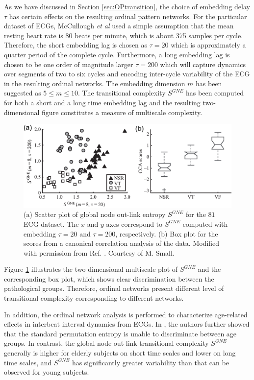 	As we have discussed in Section \ref{sec:OPtransition}, the choice of embedding delay $\tau$ has certain effects on the resulting ordinal pattern networks. For the particular dataset of ECGs, McCullough {\textit{et al}} used a simple assumption that the mean resting heart rate is $80$ beats per minute, which is about 375 samples per cycle. Therefore, the short embedding lag is chosen as $\tau = 20$ which is approximately a quarter period of the complete cycle. Furthermore, a long embedding lag is chosen to be one order of magnitude larger $\tau = 200$ which will capture dynamics over segments of two to six cycles and encoding inter-cycle variability of the ECG in the resulting ordinal networks. The embedding dimension $m$ has been suggested as $5 \leq m \leq 10$. The transitional complexity $S^{GNE}$ has been computed for both a short and a long time embedding lag and the resulting two-dimensional figure constitutes a measure of multiscale complexity.
\begin{figure}[ht]
	\centering
	\includegraphics[width=\columnwidth]{Chapter06_Applications/RIE_CCU_ECG.eps}
\caption{(a) Scatter plot of global node out-link entropy $S^{GNE}$ for the $81$ ECG dataset. The $x$-and $y$-axes
correspond to $S^{GNE}$ computed with embedding $\tau =20$ and $\tau = 200$, respectively. (b) Box plot for the scores from a canonical correlation analysis of the data. Modified with permission from Ref. \cite{McCullough2017b}. Courtesy of M. Small. \label{fig:rieECG}}
\end{figure}

	Figure \ref{fig:rieECG} illustrates the two dimensional multiscale plot of $S^{GNE}$ and the corresponding box plot, which shows clear discrimination between the pathological groups. Therefore, ordinal networks present different level of transitional complexity corresponding to different networks.%

		In addition, the ordinal network analysis is performed to characterize age-related effects in interbeat interval dynamics from ECGs. In \cite{McCullough2017b}, the authors further showed that the standard permutation entropy is unable to discriminate between age groups. In contrast, the global node out-link transitional complexity $S^{GNE}$ generally is higher for elderly subjects on short time scales and lower on long time scales, and $S^{GNE}$ has significantly greater variability than that can be observed for young subjects.
